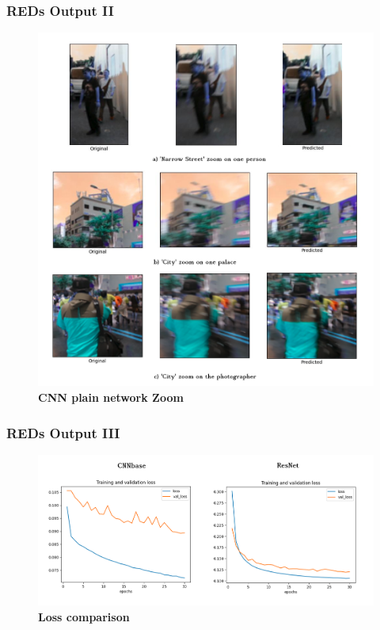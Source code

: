 \documentclass [handout] {beamer}
\begin{document}
	
\begin{frame}
	\frametitle{REDs Output II}
	\begin{figure}
		\centering
		\includegraphics[scale=0.22]{REDs_CNNBase_Outputs_Zoom.png} 
		\tiny{\caption{\textbf{CNN plain network Zoom}}}
	\end{figure}
\end{frame} 


\begin{frame}
	\frametitle{REDs Output III}
	\begin{figure}
		\centering
		\includegraphics[scale=0.3]{Loss_accuracy_comparison_REDs.png} 
		\tiny{\caption{\textbf{Loss comparison}}}
	\end{figure}
\end{frame}
\end{document}
